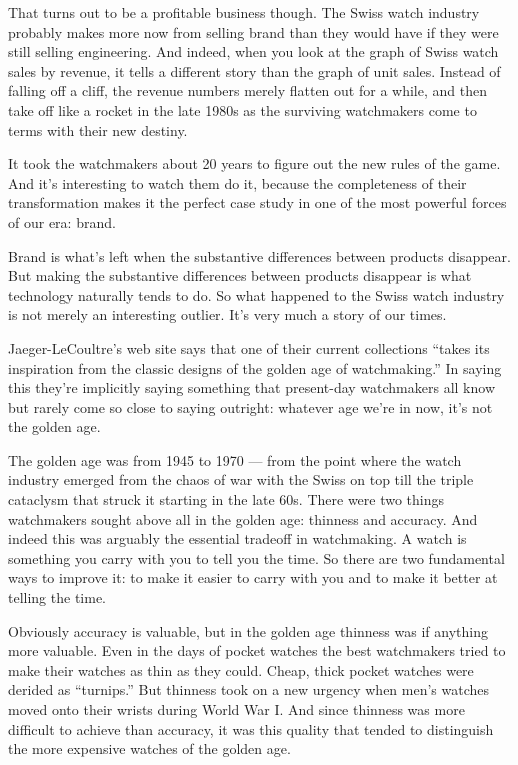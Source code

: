 That turns out to be a profitable business though. The Swiss watch
industry probably makes more now from selling brand than they would have
if they were still selling engineering. And indeed, when you look at the
graph of Swiss watch sales by revenue, it tells a different story than
the graph of unit sales. Instead of falling off a cliff, the revenue
numbers merely flatten out for a while, and then take off like a rocket
in the late 1980s as the surviving watchmakers come to terms with their
new destiny.

It took the watchmakers about 20 years to figure out the new rules of
the game. And it's interesting to watch them do it, because the
completeness of their transformation makes it the perfect case study in
one of the most powerful forces of our era: brand.

Brand is what's left when the substantive differences between products
disappear. But making the substantive differences between products
disappear is what technology naturally tends to do. So what happened to
the Swiss watch industry is not merely an interesting outlier. It's very
much a story of our times.

Jaeger-LeCoultre's web site says that one of their current collections
``takes its inspiration from the classic designs of the golden age of
watchmaking.'' In saying this they're implicitly saying something that
present-day watchmakers all know but rarely come so close to saying
outright: whatever age we're in now, it's not the golden age.

The golden age was from 1945 to 1970 --- from the point where the watch
industry emerged from the chaos of war with the Swiss on top till the
triple cataclysm that struck it starting in the late 60s. There were two
things watchmakers sought above all in the golden age: thinness and
accuracy. And indeed this was arguably the essential tradeoff in
watchmaking. A watch is something you carry with you to tell you the
time. So there are two fundamental ways to improve it: to make it easier
to carry with you and to make it better at telling the time.

Obviously accuracy is valuable, but in the golden age thinness was if
anything more valuable. Even in the days of pocket watches the best
watchmakers tried to make their watches as thin as they could. Cheap,
thick pocket watches were derided as ``turnips.'' But thinness took on a
new urgency when men's watches moved onto their wrists during World War
I. And since thinness was more difficult to achieve than accuracy, it
was this quality that tended to distinguish the more expensive watches
of the golden age.

